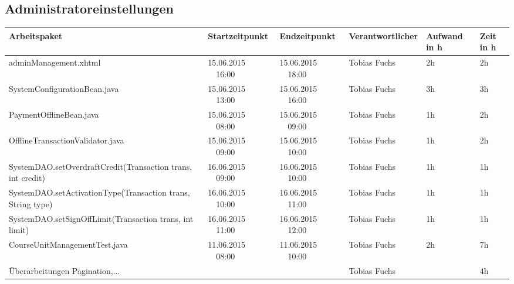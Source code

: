 \begin{landscape}
	\subsection{Administratoreinstellungen}
	\begin{tabular}{|p{10.3cm}|p{3.2cm}|p{3.2cm}|p{3.5cm}|p{1.7cm}|p{1.5cm}|}
		\hline  \textbf{Arbeitspaket} & \textbf{Startzeitpunkt} & \textbf{Endzeitpunkt} & \textbf{Verantwortlicher}  & \textbf{Aufwand in h} & \textbf{Zeit in h}\\
		\hline   adminManagement.xhtml                                 & 15.06.2015 \ \ 16:00       & 15.06.2015  \ \  18:00      & Tobias Fuchs &  2h   & 2h\\
		\hline   SystemConfigurationBean.java                          & 15.06.2015 \ \ 13:00       & 15.06.2015  \ \  16:00      & Tobias Fuchs &  3h   & 3h\\
		\hline   PaymentOfflineBean.java                               & 15.06.2015 \ \ 08:00       & 15.06.2015  \ \  09:00      & Tobias Fuchs &  1h   & 2h\\
		\hline   OfflineTransactionValidator.java                      & 15.06.2015 \ \ 09:00       & 15.06.2015  \ \  10:00      & Tobias Fuchs &  1h   & 2h\\
		\hline   SystemDAO.setOverdraftCredit(Transaction trans, int credit)  & 16.06.2015 \ \ 09:00       & 16.06.2015  \ \  10:00      & Tobias Fuchs &  1h   & 1h\\
		\hline   SystemDAO.setActivationType(Transaction trans, String type)  & 16.06.2015 \ \ 10:00       & 16.06.2015  \ \  11:00      & Tobias Fuchs &  1h   & 1h\\
		\hline   SystemDAO.setSignOffLimit(Transaction trans, int limit)      & 16.06.2015 \ \ 11:00       & 16.06.2015  \ \  12:00      & Tobias Fuchs &  1h   & 1h\\
		\hline   CourseUnitManagementTest.java                           & 11.06.2015 \ \ 08:00       & 11.06.2015  \ \  10:00       &  Tobias Fuchs &   2h     & 7h\\
		\hline   Überarbeitungen Pagination,...                     &      &                     &  Tobias Fuchs &    & 4h\\
		\hline 
	\end{tabular} \ \\
	\ \\
	

\end{landscape}
